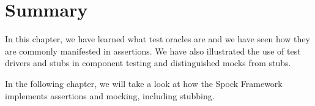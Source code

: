 \section{Summary}
In this chapter, we have learned what test oracles are
and we have seen how they are commonly manifested in assertions.
We have also illustrated the use of test drivers and stubs in component testing
and distinguished mocks from stubs.

In the following chapter,
we will take a look at how the Spock Framework
implements assertions and mocking, including stubbing.
